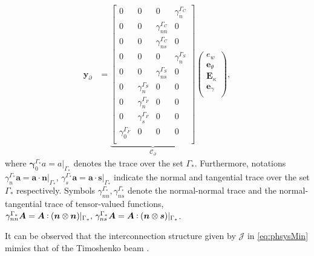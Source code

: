 \begin{equation}
\begin{aligned}
\bm{y}_\partial &= \underbrace{
\begin{bmatrix}
{0} & {0} & {0} & \gamma_{n}^{\Gamma_C} \\
{0} & {0} & \gamma_{nn}^{\Gamma_C} & {0} \\
{0} & {0} & \gamma_{ns}^{\Gamma_C} & {0} \\
{0} & {0} & {0} & \gamma_{n}^{\Gamma_S} \\
{0} & {0} & \gamma_{ns}^{\Gamma_S} & {0} \\
{0} & \gamma_{n}^{\Gamma_S} & {0} & {0} \\
{0} & \gamma_{n}^{\Gamma_F} & {0} & {0} \\
{0} & \gamma_{s}^{\Gamma_F} & {0} & {0} \\
\gamma_{0}^{\Gamma_F} & {0} & {0} & {0} \\
\end{bmatrix}}_{\mathcal{C}_\partial}
\begin{pmatrix}
e_w \\
\bm{e}_{\theta} \\
\bm{E}_{\kappa} \\
\bm{e}_{\gamma} \\
\end{pmatrix},
\end{aligned}
\end{equation}
where $\bm\gamma_{0}^{\Gamma_*}a = a\vert_{\Gamma_*}$ denotes the trace over the set $\Gamma_*$. Furthermore, notations $\gamma_{n}^{\Gamma_*}\bm{a} = \bm{a} \cdot \bm{n}\vert_{\Gamma_*}, \,  \gamma_{s}^{\Gamma_*}\bm{a}= \bm{a} \cdot \bm{s}\vert_{\Gamma_*}$ indicate the normal and tangential trace over the set $\Gamma_*$ respectively. Symbols $\gamma_{nn}^{\Gamma_*}, \gamma_{ns}^{\Gamma_*}$ denote the normal-normal trace and the normal-tangential trace of tensor-valued functions, $\gamma_{nn}^{\Gamma_*}\bm{A} = \bm{A} \cddot (\bm{n} \otimes \bm{n})\vert_{\Gamma_*}, \, \gamma_{ns}^{\Gamma_*}\bm{A} = \bm{A} \cddot (\bm{n} \otimes \bm{s})\vert_{\Gamma_*}$.

\begin{remark}
	It can be observed that the interconnection structure given by $\mathcal{J}$ in \eqref{eq:phsysMin} mimics that of the Timoshenko beam \cite[Chapter 7]{zwart2012}.
\end{remark}

